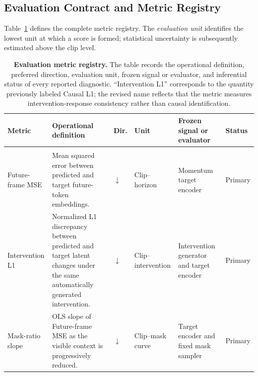 \subsection{Evaluation Contract and Metric Registry}
\label{app:metric_registry}

Table~\ref{tab:metric_registry} defines the complete metric registry.
The \emph{evaluation unit} identifies the lowest unit at which a score
is formed; statistical uncertainty is subsequently estimated above the
clip level.

\begin{table}[t]
\centering
\caption{
\textbf{Evaluation metric registry.}
The table records the operational definition, preferred direction,
evaluation unit, frozen signal or evaluator, and inferential status of
every reported diagnostic. ``Intervention L1'' corresponds to the
quantity previously labeled Causal L1; the revised name reflects that
the metric measures intervention-response consistency rather than
causal identification.
}
\label{tab:metric_registry}
\scriptsize
\setlength{\tabcolsep}{3.5pt}
\renewcommand{\arraystretch}{1.13}

\begin{tabularx}{\textwidth}{
    p{}
    p{}
    p{}
    p{}
    p{}
    X
}
\toprule
\textbf{Metric}
&
\textbf{Operational definition}
&
\textbf{Dir.}
&
\textbf{Unit}
&
\textbf{Frozen signal or evaluator}
&
\textbf{Status}
\\
\midrule

\rowcolor{AttrTeal}
\multicolumn{6}{l}{\textbf{Primary predictive diagnostics}}
\\
\midrule

Future-frame MSE
&
Mean squared error between predicted and target future-token
embeddings.
&
\(\downarrow\)
&
Clip--horizon
&
Momentum target encoder
&
Primary
\\

Intervention L1
&
Normalized L1 discrepancy between predicted and target latent changes
under the same automatically generated intervention.
&
\(\downarrow\)
&
Clip--intervention
&
Intervention generator and target encoder
&
Primary
\\

Mask-ratio slope
&
OLS slope of Future-frame MSE as the visible context is progressively
reduced.
&
\(\downarrow\)
&
Clip--mask curve
&
Target encoder and fixed mask sampler
&
Primary
\\


\end{tabularx}
\end{table}
